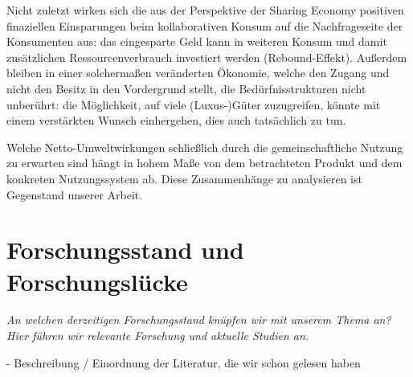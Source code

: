 \documentclass[11pt, titlepage=true]{scrartcl} %
\newcommand{\was}[1]{\small\textit{#1}}
\begin{document}
Nicht zuletzt wirken sich die aus der Perspektive der Sharing Economy positiven
finaziellen Einsparungen beim kollaborativen Konsum auf die Nachfrageseite der
Konsumenten aus: das eingesparte Geld kann in weiteren Konsum und damit
zusätzlichen Ressourcenverbrauch investiert werden (Rebound-Effekt). Außerdem
bleiben in einer solchermaßen veränderten Ökonomie, welche den Zugang und nicht
den Besitz in den Vordergrund stellt, die Bedürfnisstrukturen nicht unberührt:
die Möglichkeit, auf viele (Luxus-)Güter zuzugreifen, könnte mit einem
verstärkten Wunsch einhergehen, dies auch tatsächlich zu tun.

Welche Netto-Umweltwirkungen schließlich durch die gemeinschaftliche Nutzung zu
erwarten sind hängt in hohem Maße von dem betrachteten Produkt und dem konkreten
Nutzungssystem ab.  Diese Zusammenhänge zu
analysieren ist Gegenstand unserer Arbeit.

\section{Forschungsstand und Forschungslücke}
\was{An welchen derzeitigen Forschungsstand knüpfen wir mit unserem Thema an? Hier führen wir relevante Forschung und aktuelle Studien an.}

- Beschreibung / Einordnung der Literatur, die wir schon gelesen haben
\end{document}
